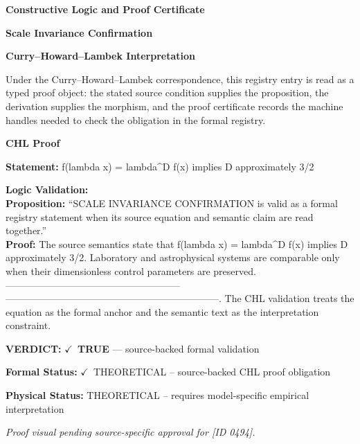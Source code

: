 \clearpage
\begingroup\tzpsupportsetup
\noindent\textbf{\fontsize{10.8pt}{12.8pt}\selectfont [ID 0494] Constructive Logic and Proof Certificate}\par
\noindent\textbf{\fontsize{10pt}{12pt}\selectfont Scale Invariance Confirmation}\par
\vspace{0.45em}
\begingroup
\footnotesize
\setlength{\parskip}{0.22em}
\setlength{\parindent}{0pt}
\noindent\textbf{Curry--Howard--Lambek Interpretation}\par
Under the Curry--Howard--Lambek correspondence, this registry entry is read as a typed proof
object: the stated source condition supplies the proposition, the derivation supplies the
morphism, and the proof certificate records the machine handles needed to check the obligation
in the formal registry.

\vspace{0.45em}
\noindent\textbf{CHL Proof}\par
\textbf{Statement:} f(lambda x) = lambda\textasciicircum{}D f(x) implies D approximately 3/2

\textbf{Logic Validation:}\\
\textbf{Proposition:} ``SCALE INVARIANCE CONFIRMATION is valid as a formal registry statement when its source
equation and semantic claim are read together.''\\
\textbf{Proof:} The source semantics state that f(lambda x) = lambda\textasciicircum{}D f(x) implies D approximately 3/2.
Laboratory and astrophysical systems are comparable only when their dimensionless
control parameters are preserved. ------------------------------------------------------
------------------------------------------------------------------. The CHL validation
treats the equation as the formal anchor and the semantic text as the interpretation
constraint.

\textbf{VERDICT:} \ensuremath{\checkmark}\ \textbf{TRUE} --- source-backed formal validation

\textbf{Formal Status:} \ensuremath{\checkmark}\ THEORETICAL -- source-backed CHL proof obligation

\textbf{Physical Status:} THEORETICAL -- requires model-specific empirical interpretation
\par\vspace{0.45em}
\par
\vfill
\begingroup\footnotesize\itshape
Proof visual pending source-specific approval for [ID 0494].
\par\endgroup
\vfill
\endgroup
\endgroup
